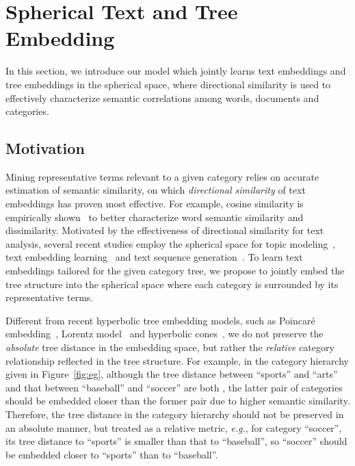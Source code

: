 \documentclass[sigconf]{acmart}
\newcommand{\eg}{\emph{e.g.}}
\theoremstyle{definition}
\begin{document}
 


\section{Spherical Text and Tree Embedding}
\label{sec:tree_text_emb}

In this section, we introduce our model \josh which jointly learns text embeddings and tree embeddings in the spherical space, where directional similarity is used to effectively characterize semantic correlations among words, documents and categories. 


\subsection{Motivation}
Mining representative terms relevant to a given category relies on accurate estimation of semantic similarity, on which \emph{directional similarity} of text embeddings has proven most effective.
For example, cosine similarity is empirically shown~\cite{Levy2014LinguisticRI} to better characterize word semantic similarity and dissimilarity.
Motivated by the effectiveness of directional similarity for text analysis, several recent studies employ the spherical space for topic modeling~\cite{batmanghelich2016nonparametric}, text embedding learning~\cite{meng2019spherical} and text sequence generation~\cite{Kumar2019VonML}.
To learn text embeddings tailored for the given category tree, we propose to jointly embed the tree structure into the spherical space where each category is surrounded by its representative terms.



Different from recent hyperbolic tree embedding models, such as Poincar{\'e} embedding~\cite{Nickel2017PoincarEF}, Lorentz model~\cite{Nickel2018LearningCH} and hyperbolic cones~\cite{Ganea2018HyperbolicEC}, we do not preserve the \emph{absolute} tree distance in the embedding space, but rather the \emph{relative} category relationship reflected in the tree structure. For example, in the category hierarchy given in Figure~\ref{fig:eg}, although the tree distance between ``sports'' and ``arts'' and that between ``baseball'' and ``soccer'' are both , the latter pair of categories should be embedded closer than the former pair due to higher semantic similarity. Therefore, the tree distance in the category hierarchy should not be preserved in an absolute manner, but treated as a relative metric, \eg, for category ``soccer'', its tree distance to ``sports'' is smaller than that to ``baseball'', so ``soccer'' should be embedded closer to ``sports'' than to ``baseball''.
\end{document}
